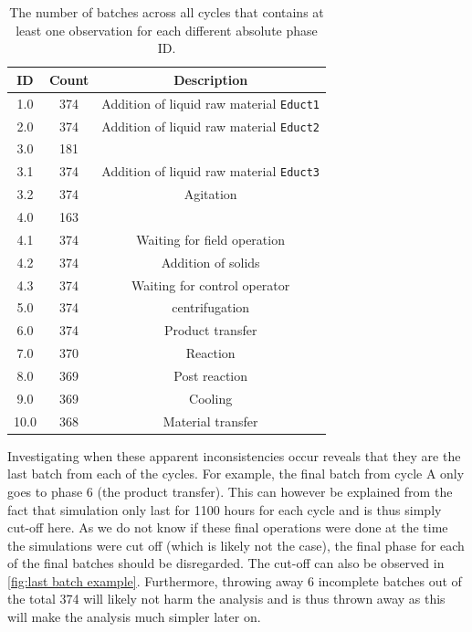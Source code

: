 \documentclass[../Thesis.tex]{subfiles}
\begin{document}
\begin{table}[h]
    \centering
\begin{tabular}{c|c|c}
        ID   & Count & Description \\\hline
        1.0  & 374 & Addition of liquid raw material \texttt{Educt1} \\
        2.0  & 374 & Addition of liquid raw material \texttt{Educt2} \\
        3.0  & 181 &  \\
        3.1  & 374 & Addition of liquid raw material \texttt{Educt3} \\
        3.2  & 374 & Agitation \\
        4.0  & 163 &  \\
        4.1  & 374 & Waiting for field operation \\
        4.2  & 374 & Addition of solids \\
        4.3  & 374 & Waiting for control operator \\
        5.0  & 374 & centrifugation \\
        6.0  & 374 & Product transfer \\
        7.0  & 370 & Reaction \\
        8.0  & 369 & Post reaction \\
        9.0  & 369 & Cooling \\
        10.0 & 368 & Material transfer
    \end{tabular}
    \caption{The number of batches across all cycles that contains at least one observation for each different absolute phase ID.}
    \label{tab:absolute phase ID batch count}
\end{table}

Investigating when these apparent inconsistencies occur reveals that they are the last batch from each of the cycles. For example, the final batch from cycle A only goes to phase 6 (the product transfer). This can however be explained from the fact that simulation only last for 1100 hours for each cycle and is thus simply cut-off here. As we do not know if these final operations were done at the time the simulations were cut off (which is likely not the case), the final phase for each of the final batches should be disregarded. The cut-off can also be observed in \autoref{fig:last batch example}. Furthermore, throwing away 6 incomplete batches out of the total 374 will likely not harm the analysis and is thus thrown away as this will make the analysis much simpler later on.
\end{document}
